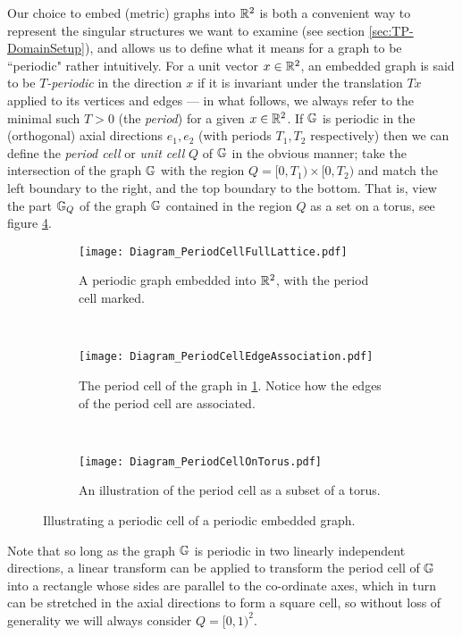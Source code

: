 Our choice to embed (metric) graphs into $\reals^2$ is both a convenient way to represent the singular structures we want to examine (see section \ref{sec:TP-DomainSetup}), and allows us to define what it means for a graph to be ``periodic" rather intuitively.
For a unit vector $x\in\mathbb{R}^2$, an embedded graph is said to be \emph{$T$-periodic} in the direction $x$ if it is invariant under the translation $Tx$ applied to its vertices and edges --- in what follows, we always refer to the minimal such $T>0$ (the \emph{period}) for a given $x\in\mathbb{R}^2$.
If $\mathbb{G}$ is periodic in the (orthogonal) axial directions $e_1, e_2$ (with periods $T_1, T_2$ respectively) then we can define the \emph{period cell} or \emph{unit cell} $Q$ of $\mathbb{G}$ in the obvious manner; take the intersection of the graph $\mathbb{G}$ with the region $Q = [0,T_1)\times [0,T_2)$ and match the left boundary to the right, and the top boundary to the bottom.
That is, view the part $\mathbb{G}_{Q}$ of the graph $\mathbb{G}$ contained in the region $Q$ as a set on a torus, see figure \ref{fig:PeriodCellIllustration}.
\begin{figure}[t!]
	\centering
	\begin{subfigure}[t]{0.45\textwidth}
		\centering
		\texttt{[image: Diagram\_PeriodCellFullLattice.pdf]}
		\caption[]{\label{fig:Diagram_PeriodCellFullLattice} A periodic graph embedded into $\reals^2$, with the period cell marked.}
	\end{subfigure}
	~
	\begin{subfigure}[t]{0.45\textwidth}
		\centering
		\texttt{[image: Diagram\_PeriodCellEdgeAssociation.pdf]}
		\caption[]{\label{fig:Diagram_PeriodCellEdgeAssociation} The period cell of the graph in \ref{fig:Diagram_PeriodCellFullLattice}. Notice how the edges of the period cell are associated.}
	\end{subfigure}
	\\
	\begin{subfigure}[b]{0.75\textwidth}
		\centering
		\texttt{[image: Diagram\_PeriodCellOnTorus.pdf]}
		\caption[]{\label{fig:Diagram_PeriodCellOnTorus} An illustration of the period cell as a subset of a torus.}
	\end{subfigure}
	\caption[The period cell of a periodic graph embedded in $\reals^2$; viewed as a subregion of $\reals^2$, and on the torus.]{\label{fig:PeriodCellIllustration} Illustrating a periodic cell of a periodic embedded graph.}
\end{figure} 
Note that so long as the graph $\mathbb{G}$ is periodic in two linearly independent directions, a linear transform can be applied to transform the period cell of $\mathbb{G}$ into a rectangle whose sides are parallel to the co-ordinate axes, which in turn can be stretched in the axial directions to form a square cell, so without loss of generality we will always consider $Q=[0,1)^2$.
